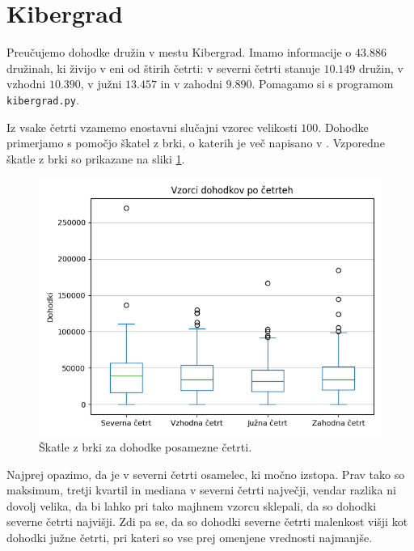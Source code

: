 \documentclass[12pt, a4paper]{article}
\begin{document}
\author{Jan Pantner \\
\small Profesor: doc.~dr.~Martin~Raič}
\date{September 2024}
\maketitle
\thispagestyle{empty}

\newpage

\tableofcontents
\newpage

\section{Kibergrad}

Preučujemo dohodke družin v mestu Kibergrad. Imamo informacije o $43.886$ družinah, 
ki živijo v eni od štirih četrti: v severni četrti stanuje $10.149$ družin, v
vzhodni $10.390$, v južni $13.457$ in v zahodni $9.890$. Pomagamo si 
s programom \texttt{kibergrad.py}.

Iz vsake četrti vzamemo enostavni slučajni vzorec velikosti $100$. 
Dohodke primerjamo s pomočjo škatel z brki, o katerih je več 
napisano v \cite[poglavje~10.6]{rice2007mathematical}.
Vzporedne škatle z brki so prikazane na sliki \ref{img:cetrti}.
\begin{figure}[H]
    \centering
    \includegraphics[width=12cm]{Slike/vse_cetrti.png}
    \caption{Škatle z brki za dohodke posamezne četrti.}
    \label{img:cetrti}
\end{figure}
Najprej opazimo, da je v severni četrti osamelec, ki močno izstopa. Prav tako so maksimum, tretji 
kvartil in mediana v severni četrti največji, vendar razlika ni dovolj velika, 
da bi lahko pri tako majhnem vzorcu sklepali, da so dohodki severne četrti 
najvišji. Zdi pa se, da so dohodki severne četrti malenkost višji kot dohodki 
južne četrti, pri kateri so vse prej omenjene vrednosti najmanjše. 
\end{document}

